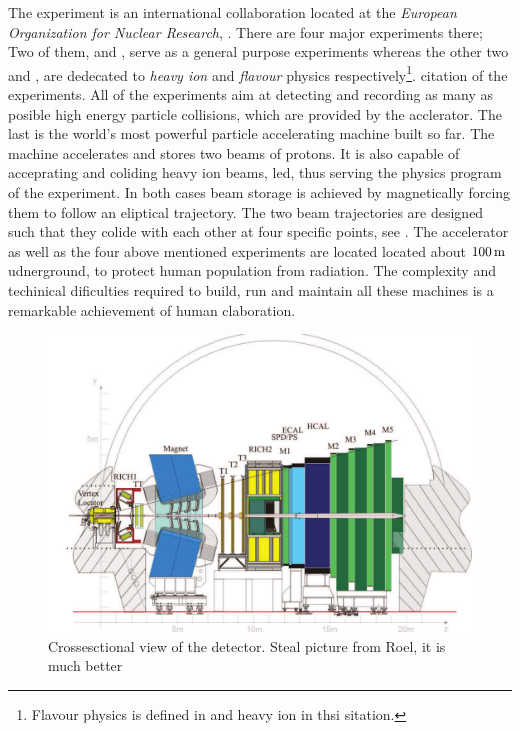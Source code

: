 
The \lhcb experiment is an international collaboration located at the {\it European Organization for Nuclear Research}, \cern.
There are four major experiments there; Two of them, \atlas and \cms, serve as a general purpose experiments whereas the other
two \alice and \lhcb, are dedecated to {\it heavy ion} and {\it flavour} physics respectively\footnote{Flavour physics is  defined in and heavy ion in thsi sitation.}.
{\color{red} citation of the experiments}. All of the experiments aim at detecting and recording as many as posible high energy
particle collisions, which are provided by the \lhc acclerator. The last is the world's most powerful particle accelerating
machine built so far. The \lhc machine accelerates and stores two beams of protons. It is also capable of acceprating
and coliding heavy ion beams, \eg led, thus serving the physics program of the \alice experiment.
In both cases beam storage is achieved by magnetically forcing them to follow an eliptical trajectory.
The two beam trajectories are designed such that they colide with each other at four specific points, see \figref{}.
The \lhc accelerator as well as the four above mentioned experiments are located located about $100\rm \,m$ udnerground,
to protect human population from radiation. The complexity and techinical dificulties required to build, run and maintain
all these machines is a remarkable achievement of human claboration.

\begin{figure}[t]
  \centering
  \includegraphics[width=\textwidth]{Figures/Chapter2/detector_cross_cmyk}
  \caption{Crossesctional view of the \lhcb detector. {\color{red} Steal picture from Roel, it is much better}}
  \label{lhcb_detector_cross_section}
\end{figure}


